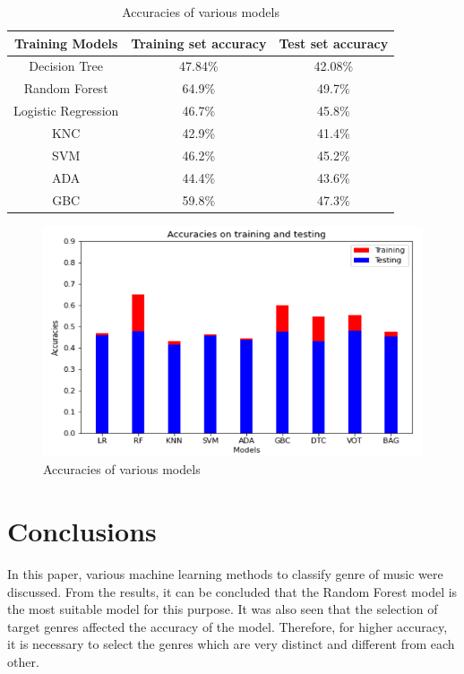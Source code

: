 \documentclass[conference]{IEEEtran}
\begin{document}
\begin{table}[htbp]
\caption{Accuracies of various models}
\begin{center}
\begin{tabular}{|c|c|c|}
\hline
\textbf{Training Models} & \textbf{Training set accuracy} & \textbf{Test set accuracy} \\
\hline
Decision Tree & 47.84\% & 42.08\% \\
\hline 
Random Forest & 64.9\% & 49.7\% \\
\hline
Logistic Regression & 46.7\% & 45.8\% \\
\hline
KNC & 42.9\% & 41.4\% \\
\hline
SVM & 46.2\% & 45.2\% \\
\hline
ADA & 44.4\% & 43.6\% \\
\hline
GBC & 59.8\% & 47.3\% \\
\hline                             
\end{tabular}
\end{center}
\end{table}

\begin{figure}[htbp]
\centering
\includegraphics[width=.9\linewidth]{./images/model_comparison.png}
\caption{Accuracies of various models}
\end{figure}

\section{Conclusions}
\label{sec:org59ccc4b}

In this paper, various machine learning methods to classify genre of music were discussed. From the results, it can be concluded that the Random Forest model is the most suitable model for this purpose. It was also seen that the selection of target genres affected the accuracy of the model. Therefore, for higher accuracy, it is necessary to select the genres which are very distinct and different from each other.




\end{document}
